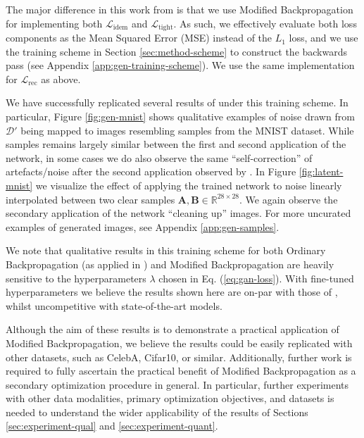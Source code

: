\documentclass{article}
\theoremstyle{plain}
\theoremstyle{definition}
\theoremstyle{remark}
\newcommand{\vA}{\mathbf{A}}
\newcommand{\vB}{\mathbf{B}}
\begin{document}
The major difference in this work from \citealt{shocher-ign} is that we use Modified Backpropagation for implementing both $\mathcal{L}_{\mathrm{idem}}$ and $\mathcal{L}_{\mathrm{tight}}$. As such, we effectively evaluate both loss components as the Mean Squared Error (MSE) instead of the $L_1$ loss, and we use the training scheme in Section \ref{sec:method-scheme} to construct the backwards pass (see Appendix \ref{app:gen-training-scheme}). We use the same implementation for $\mathcal{L}_{\mathrm{rec}}$ as above.

We have successfully replicated several results of \citealt{shocher-ign} under this training scheme. In particular, Figure \ref{fig:gen-mnist} shows qualitative examples of noise drawn from $\mathcal{D}'$ being mapped to images resembling samples from the MNIST dataset. While samples remains largely similar between the first and second application of the network, in some cases we do also observe the same ``self-correction'' of artefacts/noise after the second application observed by \citealt{shocher-ign}. In Figure \ref{fig:latent-mnist} we visualize the effect of applying the trained network to noise linearly interpolated between two clear samples $\vA, \vB \in \mathbb{R}^{28 \times 28}$. We again observe the secondary application of the network ``cleaning up'' images. For more uncurated examples of generated images, see Appendix \ref{app:gen-samples}.

We note that qualitative results in this training scheme for both Ordinary Backpropagation (as applied in \citealt{shocher-ign}) and Modified Backpropagation are heavily sensitive to the hyperparameters $\lambda$ chosen in Eq. (\ref{eq:gan-loss}). With fine-tuned hyperparameters we believe the results shown here are on-par with those of \citealt{shocher-ign}, whilst uncompetitive with state-of-the-art models.


Although the aim of these results is to demonstrate a practical application of Modified Backpropagation, we believe the results could be easily replicated with other datasets, such as CelebA, Cifar10, or similar. Additionally, further work is required to fully ascertain the practical benefit of Modified Backpropagation as a secondary optimization procedure in general. In particular, further experiments with other data modalities, primary optimization objectives, and datasets is needed to understand the wider applicability of the results of Sections \ref{sec:experiment-qual} and \ref{sec:experiment-quant}.
\end{document}
